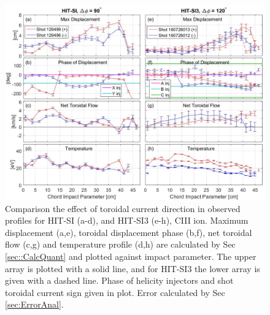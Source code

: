 	\begin{figure}
		\hspace*{-10ex}\includegraphics[width=7in]{C_III_Compare_1}\caption{Comparison the effect of toroidal current direction in observed profiles for HIT-SI (a-d), and HIT-SI3 (e-h), CIII ion. Maximum displacement (a,e), toroidal displacement phase (b,f), net toroidal flow (c,g) and temperature profile (d,h) are calculated by Sec \ref{sec::CalcQuant} and plotted against impact parameter. The upper array is plotted with a solid line, and for HIT-SI3 the lower array is given with a dashed line. Phase of helicity injectors and shot toroidal current sign given in plot. Error calculated by Sec \ref{sec:ErrorAnal}.}\label{Fig::PosNeg_HIT-SI3}
	\end{figure}
